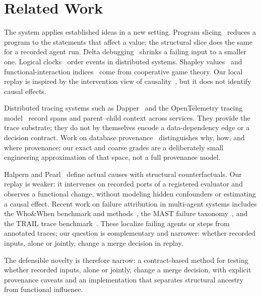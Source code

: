 \documentclass[11pt]{article}
\begin{document}
\section{Related Work}\label{sec:related}
The system applies established ideas in a new setting. Program slicing~\cite{weiser1981} reduces a program to the statements that affect a value; the structural slice does the same for a recorded agent run. Delta debugging~\cite{zeller2002} shrinks a failing input to a smaller one. Logical clocks~\cite{lamport1978} order events in distributed systems. Shapley values~\cite{shapley1953} and functional-interaction indices~\cite{grabisch1999} come from cooperative game theory. Our local replay is inspired by the intervention view of causality~\cite{pearl2009}, but it does not identify causal effects.

Distributed tracing systems such as Dapper~\cite{dapper2010} and the OpenTelemetry tracing model~\cite{opentelemetry2025} record spans and parent--child context across services. They provide the trace substrate; they do not by themselves encode a data-dependency edge or a decision contract. Work on database provenance~\cite{cheney2009} distinguishes why, how, and where provenance; our exact and coarse grades are a deliberately small engineering approximation of that space, not a full provenance model.

Halpern and Pearl~\cite{halpern2005} define actual causes with structural counterfactuals. Our replay is weaker: it intervenes on recorded ports of a registered evaluator and observes a functional change, without modeling hidden confounders or estimating a causal effect. Recent work on failure attribution in multi-agent systems includes the Who\&When benchmark and methods~\cite{zhang2025}, the MAST failure taxonomy~\cite{cemri2025}, and the TRAIL trace benchmark~\cite{trail2025}. These localize failing agents or steps from annotated traces; our question is complementary and narrower: whether recorded inputs, alone or jointly, change a merge decision in replay.

The defensible novelty is therefore narrow: a contract-based method for testing whether recorded inputs, alone or jointly, change a merge decision, with explicit provenance caveats and an implementation that separates structural ancestry from functional influence.
\end{document}
